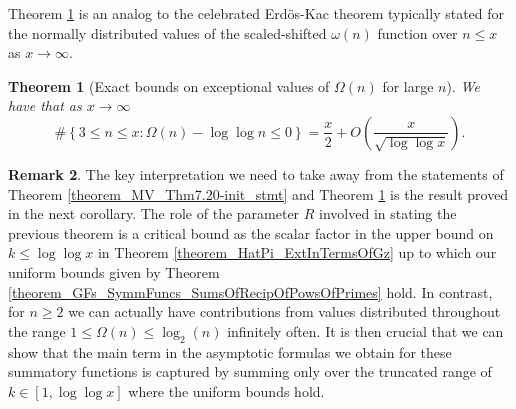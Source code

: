 \documentclass[11pt,reqno,a4letter]{article}
\numberwithin{figure}{section}
\numberwithin{table}{section}
\theoremstyle{plain}
\newtheorem{theorem}{Theorem}
\numberwithin{theorem}{section}
\theoremstyle{definition}
\newtheorem{remark}[theorem]{Remark}
\begin{document}
Theorem \ref{theorem_MV_Thm7.21-init_stmt} is an analog to the 
celebrated Erd\"os-Kac theorem typically stated for the 
normally distributed values of the scaled-shifted $\omega(n)$ function over $n \leq x$ as 
$x \rightarrow \infty$. 

\begin{theorem}[Exact bounds on exceptional values of $\Omega(n)$ for large $n$] 
\label{theorem_MV_Thm7.21-init_stmt} 
We have that as $x \rightarrow \infty$ 
\[
\#\left\{3 \leq n \leq x: \Omega(n) - \log\log n \leq 0\right\} = 
     \frac{x}{2} + O\left(\frac{x}{\sqrt{\log\log x}}\right). 
\]
\end{theorem} 

\begin{remark} 
The key interpretation we need to take away from the statements 
of Theorem \ref{theorem_MV_Thm7.20-init_stmt} and 
Theorem \ref{theorem_MV_Thm7.21-init_stmt} 
is the result proved in the next corollary. 
The role of the parameter $R$ involved in stating the previous theorem 
is a critical bound as the scalar factor in the upper bound on $k \leq \log\log x$ in 
Theorem \ref{theorem_HatPi_ExtInTermsOfGz} up to which our uniform bounds given by 
Theorem \ref{theorem_GFs_SymmFuncs_SumsOfRecipOfPowsOfPrimes} hold. 
In contrast, for $n \geq 2$ we can actually 
have contributions from values distributed throughout the range $1 \leq \Omega(n) \leq \log_2(n)$ 
infinitely often. 
It is then crucial that we can show that the main term in the asymptotic formulas we obtain 
for these summatory functions is captured by summing only over the truncated range of 
$k \in [1, \log\log x]$ where the uniform bounds hold. 
\end{remark} 
\end{document}
